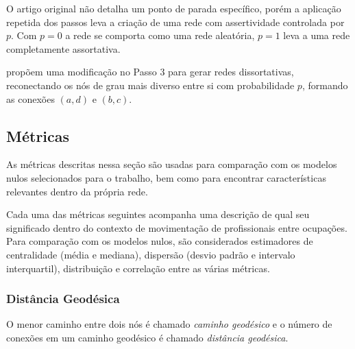 \documentclass[12pt,a4paper]{article}
\theoremstyle{hypo}
\begin{document}
O artigo original não detalha um ponto de parada específico, porém a aplicação repetida dos passos leva a criação de uma rede com assertividade controlada por $p$. Com $p = 0$ a rede se comporta como uma rede aleatória, $p = 1$ leva a uma rede completamente assortativa.
 
 propõem uma modificação no Passo 3 para gerar redes dissortativas, reconectando os nós de grau mais diverso entre si com probabilidade $p$, formando as conexões $(a, d)$ e $(b, c)$.


\subsection{Métricas}

As métricas descritas nessa seção são usadas para comparação com os modelos nulos selecionados para o trabalho, bem como para encontrar características relevantes dentro da própria rede.

Cada uma das métricas seguintes acompanha uma descrição de qual seu significado dentro do contexto de movimentação de profissionais entre ocupações.
Para comparação com os modelos nulos, são considerados estimadores de centralidade (média e mediana), dispersão (desvio padrão e intervalo interquartil), distribuição e correlação entre as várias métricas.

\subsubsection{Distância Geodésica} \label{sec:distancia-geodesica}

O menor caminho entre dois nós é chamado \textit{caminho geodésico} e o número de conexões em um caminho geodésico é chamado \textit{distância geodésica}.
\end{document}

